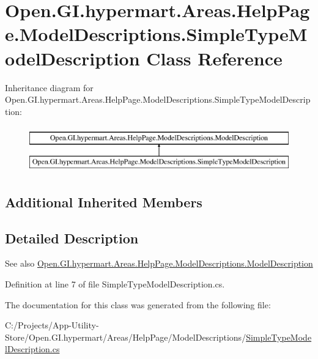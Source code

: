 \hypertarget{class_open_1_1_g_i_1_1hypermart_1_1_areas_1_1_help_page_1_1_model_descriptions_1_1_simple_type_model_description}{}\section{Open.\+G\+I.\+hypermart.\+Areas.\+Help\+Page.\+Model\+Descriptions.\+Simple\+Type\+Model\+Description Class Reference}
\label{class_open_1_1_g_i_1_1hypermart_1_1_areas_1_1_help_page_1_1_model_descriptions_1_1_simple_type_model_description}


 


Inheritance diagram for Open.\+G\+I.\+hypermart.\+Areas.\+Help\+Page.\+Model\+Descriptions.\+Simple\+Type\+Model\+Description\+:\begin{figure}[H]
\begin{center}
\leavevmode
\includegraphics[height=2.000000cm]{class_open_1_1_g_i_1_1hypermart_1_1_areas_1_1_help_page_1_1_model_descriptions_1_1_simple_type_model_description}
\end{center}
\end{figure}
\subsection*{Additional Inherited Members}


\subsection{Detailed Description}


\begin{DoxySeeAlso}{See also}
\hyperlink{class_open_1_1_g_i_1_1hypermart_1_1_areas_1_1_help_page_1_1_model_descriptions_1_1_model_description}{Open.\+G\+I.\+hypermart.\+Areas.\+Help\+Page.\+Model\+Descriptions.\+Model\+Description}


\end{DoxySeeAlso}


Definition at line 7 of file Simple\+Type\+Model\+Description.\+cs.



The documentation for this class was generated from the following file\+:\begin{DoxyCompactItemize}
\item 
C\+:/\+Projects/\+App-\/\+Utility-\/\+Store/\+Open.\+G\+I.\+hypermart/\+Areas/\+Help\+Page/\+Model\+Descriptions/\hyperlink{_simple_type_model_description_8cs}{Simple\+Type\+Model\+Description.\+cs}\end{DoxyCompactItemize}

